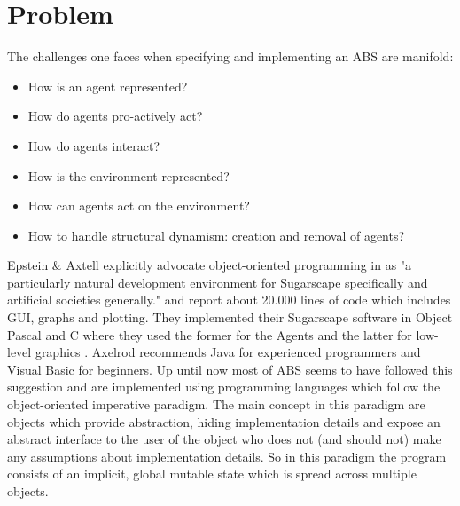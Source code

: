 \section{Problem}
The challenges one faces when specifying and implementing an ABS are manifold:

\begin{itemize}
	\item How is an agent represented?
	\item How do agents pro-actively act?
	\item How do agents interact?
	\item How is the environment represented?
	\item How can agents act on the environment?
	\item How to handle structural dynamism: creation and removal of agents?
\end{itemize}

Epstein \& Axtell explicitly advocate object-oriented programming in \cite{epstein_growing_1996} as "a particularly natural development environment for Sugarscape specifically and artificial societies generally." and report about 20.000 lines of code which includes GUI, graphs and plotting. They implemented their Sugarscape software in Object Pascal and C where they used the former for the Agents and the latter for low-level graphics \cite{axtell_aligning_1996}. Axelrod \cite{axelrod_advancing_1997} recommends Java for experienced programmers and Visual Basic for beginners. Up until now most of ABS seems to have followed this suggestion and are implemented using programming languages which follow the object-oriented imperative paradigm.
The main concept in this paradigm are objects which provide abstraction, hiding implementation details and expose an abstract interface to the user of the object who does not (and should not) make any assumptions about implementation details. So in this paradigm the program consists of an implicit, global mutable state which is spread across multiple objects. 

